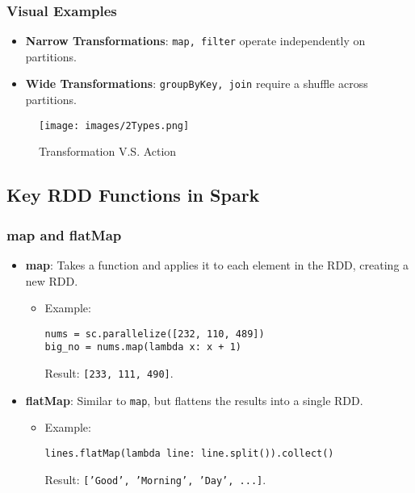 \documentclass[12pt]{article}
\begin{document}
\subsubsection{Visual Examples}
\begin{itemize}
    \item \textbf{Narrow Transformations}: \texttt{map, filter} operate independently on partitions.
    \item \textbf{Wide Transformations}: \texttt{groupByKey, join} require a shuffle across partitions.
\end{itemize}

\begin{figure}[htbp]
    \centering
    \texttt{[image: images/2Types.png]}
    \caption{Transformation V.S. Action}
    \label{fig:enter-label}
\end{figure}


\subsection{Key RDD Functions in Spark}

\subsubsection*{map and flatMap}
\begin{itemize}
    \item \textbf{map}: Takes a function and applies it to each element in the RDD, creating a new RDD.
    \begin{itemize}
        \item Example:
        \begin{verbatim}
nums = sc.parallelize([232, 110, 489])
big_no = nums.map(lambda x: x + 1)
        \end{verbatim}
        Result: \texttt{[233, 111, 490]}.
    \end{itemize}
    \item \textbf{flatMap}: Similar to \texttt{map}, but flattens the results into a single RDD.
    \begin{itemize}
        \item Example:
        \begin{verbatim}
lines.flatMap(lambda line: line.split()).collect()
        \end{verbatim}
        Result: \texttt{['Good', 'Morning', 'Day', ...]}.
    \end{itemize}
\end{itemize}
\end{document}
